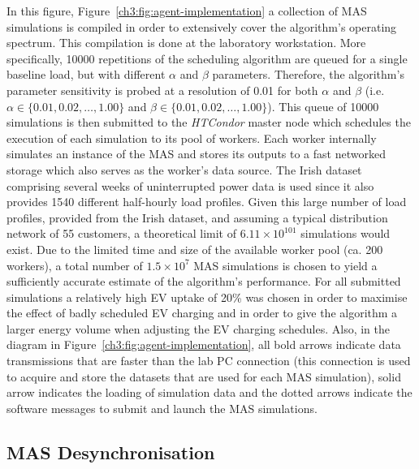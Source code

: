 In this figure, Figure~\ref{ch3:fig:agent-implementation} a collection of MAS simulations is compiled in order to extensively cover the algorithm's operating spectrum.
This compilation is done at the laboratory workstation.
More specifically, 10000 repetitions of the scheduling algorithm are queued for a single baseline load, but with different $\alpha$ and $\beta$ parameters.
Therefore, the algorithm's parameter sensitivity is probed at a resolution of 0.01 for both $\alpha$ and $\beta$ (i.e. $\alpha \in \{0.01, 0.02, \dots, 1.00\}$ and $\beta \in \{0.01, 0.02, \dots, 1.00\}$).
This queue of 10000 simulations is then submitted to the \textit{HTCondor} master node which schedules the execution of each simulation to its pool of workers.
Each worker internally simulates an instance of the MAS and stores its outputs to a fast networked storage which also serves as the worker's data source.
The Irish dataset \cite{IrishData2002} comprising several weeks of uninterrupted power data is used since it also provides 1540 different half-hourly load profiles.
Given this large number of load profiles, provided  from the Irish dataset, and assuming a typical distribution network of 55 customers, a theoretical limit of $6.11\times10^{101}$ simulations would exist.
Due to the limited time and size of the available worker pool (ca. 200 workers), a total number of $1.5\times10^{7}$ MAS simulations is chosen to yield a sufficiently accurate estimate of the algorithm's performance.
For all submitted simulations a relatively high EV uptake of 20\% was chosen in order to maximise the effect of badly scheduled EV charging and in order to give the algorithm a larger energy volume when adjusting the EV charging schedules.
Also, in the diagram in Figure~\ref{ch3:fig:agent-implementation}, all bold arrows indicate data transmissions that are faster than the lab PC connection (this connection is used to acquire and store the datasets that are used for each MAS simulation), solid arrow indicates the loading of simulation data and the dotted arrows indicate the software messages to submit and launch the MAS simulations.

\subsection{MAS Desynchronisation}
\label{ch3:subsec:desynchronisation}

